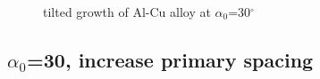 \documentclass[a4paper,12pt]{article}
\begin{document}
\begin{figure}[!ht]
     \hfill
     \caption{tilted growth of Al-Cu alloy at $\alpha_0$=30$^\circ$}
     \label{fig:Ech}
   \end{figure}
\subsection{$\alpha_0$=30, increase primary spacing}
\end{document}
